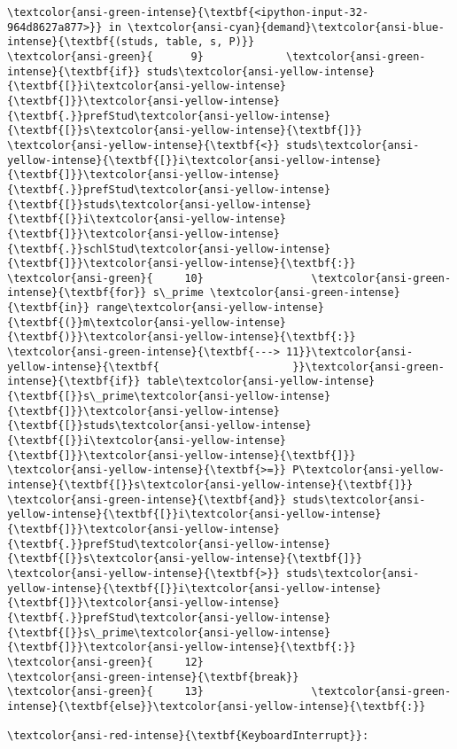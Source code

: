 \documentclass[11pt]{article}
\begin{document}
\begin{Verbatim}[commandchars=\\\{\}, frame=single, framerule=2mm, rulecolor=\color{outerrorbackground}]
\textcolor{ansi-green-intense}{\textbf{<ipython-input-32-964d8627a877>}} in \textcolor{ansi-cyan}{demand}\textcolor{ansi-blue-intense}{\textbf{(studs, table, s, P)}}
\textcolor{ansi-green}{      9}             \textcolor{ansi-green-intense}{\textbf{if}} studs\textcolor{ansi-yellow-intense}{\textbf{[}}i\textcolor{ansi-yellow-intense}{\textbf{]}}\textcolor{ansi-yellow-intense}{\textbf{.}}prefStud\textcolor{ansi-yellow-intense}{\textbf{[}}s\textcolor{ansi-yellow-intense}{\textbf{]}} \textcolor{ansi-yellow-intense}{\textbf{<}} studs\textcolor{ansi-yellow-intense}{\textbf{[}}i\textcolor{ansi-yellow-intense}{\textbf{]}}\textcolor{ansi-yellow-intense}{\textbf{.}}prefStud\textcolor{ansi-yellow-intense}{\textbf{[}}studs\textcolor{ansi-yellow-intense}{\textbf{[}}i\textcolor{ansi-yellow-intense}{\textbf{]}}\textcolor{ansi-yellow-intense}{\textbf{.}}schlStud\textcolor{ansi-yellow-intense}{\textbf{]}}\textcolor{ansi-yellow-intense}{\textbf{:}}
\textcolor{ansi-green}{     10}                 \textcolor{ansi-green-intense}{\textbf{for}} s\_prime \textcolor{ansi-green-intense}{\textbf{in}} range\textcolor{ansi-yellow-intense}{\textbf{(}}m\textcolor{ansi-yellow-intense}{\textbf{)}}\textcolor{ansi-yellow-intense}{\textbf{:}}
\textcolor{ansi-green-intense}{\textbf{---> 11}}\textcolor{ansi-yellow-intense}{\textbf{                     }}\textcolor{ansi-green-intense}{\textbf{if}} table\textcolor{ansi-yellow-intense}{\textbf{[}}s\_prime\textcolor{ansi-yellow-intense}{\textbf{]}}\textcolor{ansi-yellow-intense}{\textbf{[}}studs\textcolor{ansi-yellow-intense}{\textbf{[}}i\textcolor{ansi-yellow-intense}{\textbf{]}}\textcolor{ansi-yellow-intense}{\textbf{]}} \textcolor{ansi-yellow-intense}{\textbf{>=}} P\textcolor{ansi-yellow-intense}{\textbf{[}}s\textcolor{ansi-yellow-intense}{\textbf{]}} \textcolor{ansi-green-intense}{\textbf{and}} studs\textcolor{ansi-yellow-intense}{\textbf{[}}i\textcolor{ansi-yellow-intense}{\textbf{]}}\textcolor{ansi-yellow-intense}{\textbf{.}}prefStud\textcolor{ansi-yellow-intense}{\textbf{[}}s\textcolor{ansi-yellow-intense}{\textbf{]}} \textcolor{ansi-yellow-intense}{\textbf{>}} studs\textcolor{ansi-yellow-intense}{\textbf{[}}i\textcolor{ansi-yellow-intense}{\textbf{]}}\textcolor{ansi-yellow-intense}{\textbf{.}}prefStud\textcolor{ansi-yellow-intense}{\textbf{[}}s\_prime\textcolor{ansi-yellow-intense}{\textbf{]}}\textcolor{ansi-yellow-intense}{\textbf{:}}
\textcolor{ansi-green}{     12}                         \textcolor{ansi-green-intense}{\textbf{break}}
\textcolor{ansi-green}{     13}                 \textcolor{ansi-green-intense}{\textbf{else}}\textcolor{ansi-yellow-intense}{\textbf{:}}

\textcolor{ansi-red-intense}{\textbf{KeyboardInterrupt}}: 
    \end{Verbatim}


    
    
    
\end{document}
